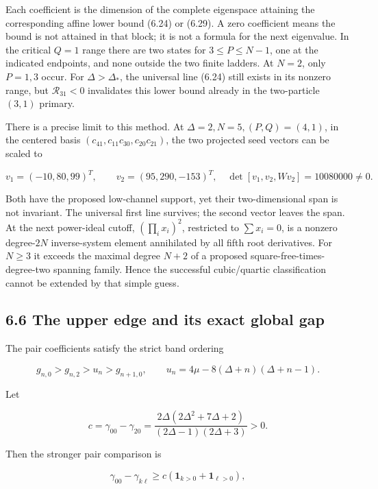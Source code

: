 Each coefficient is the dimension of the complete eigenspace attaining the corresponding affine lower bound (6.24) or (6.29). A zero coefficient means the bound is not attained in that block; it is not a formula for the next eigenvalue. In the critical \(Q=1\) range there are two states for \(3\le P\le N-1\), one at the indicated endpoints, and none outside the two finite ladders. At \(N=2\), only \(P=1,3\) occur. For \(\Delta>\Delta_*\), the universal line (6.24) still exists in its nonzero range, but \(\mathcal R_{31}<0\) invalidates this lower bound already in the two-particle \((3,1)\) primary.

There is a precise limit to this method. At \(\Delta=2,N=5,(P,Q)=(4,1)\), in the centered basis \((c_{41},c_{11}c_{30},c_{20}c_{21})\), the two projected seed vectors can be scaled to

\[
v_1=(-10,80,99)^T,\qquad v_2=(95,290,-153)^T,
\quad\det[v_1,v_2,Wv_2]=10080000\ne0.
\tag{6.37}
\]

Both have the proposed low-channel support, yet their two-dimensional span is not invariant. The universal first line survives; the second vector leaves the span. At the next power-ideal cutoff, \((\prod_i x_i)^2\), restricted to \(\sum x_i=0\), is a nonzero degree-\(2N\) inverse-system element annihilated by all fifth root derivatives. For \(N\ge3\) it exceeds the maximal degree \(N+2\) of a proposed square-free-times-degree-two spanning family. Hence the successful cubic/quartic classification cannot be extended by that simple guess.

\hypertarget{the-upper-edge-and-its-exact-global-gap}{%
\subsection{6.6 The upper edge and its exact global gap}\label{the-upper-edge-and-its-exact-global-gap}}

The pair coefficients satisfy the strict band ordering

\[
g_{n,0}>g_{n,2}>u_n>g_{n+1,0},
\qquad u_n=4\mu-8(\Delta+n)(\Delta+n-1).
\tag{6.38}
\]

Let

\[
c=\gamma_{00}-\gamma_{20}
=\frac{2\Delta(2\Delta^2+7\Delta+2)}{(2\Delta-1)(2\Delta+3)}>0.
\tag{6.39}
\]

Then the stronger pair comparison is

\[
\gamma_{00}-\gamma_{k\ell}
\ge c(\mathbf1_{k>0}+\mathbf1_{\ell>0}),
\tag{6.40}
\]

